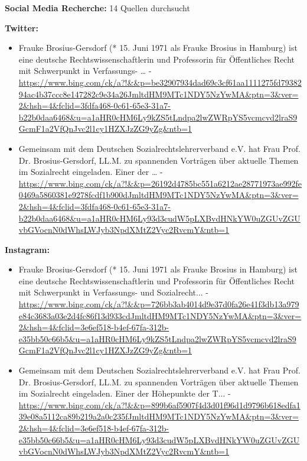 \documentclass[12pt,a4paper]{article}
\begin{document}
\textbf{Social Media Recherche:} 14 Quellen durchsucht

\textbf{Twitter:}
\begin{itemize}
\item Frauke Brosius-Gersdorf (* 15. Juni 1971 als Frauke Brosius in Hamburg) ist eine deutsche Rechtswissenschaftlerin und Professorin für Öffentliches Recht mit Schwerpunkt in Verfassungs- … - \url{https://www.bing.com/ck/a?!&&p=be32907934dad69c3cf61aa1111275fd7938294ac4b37ccc8e147282c9e34a26JmltdHM9MTc1NDY5NzYwMA&ptn=3&ver=2&hsh=4&fclid=3fdfa468-0c61-65e3-31a7-b22b0daa6468&u=a1aHR0cHM6Ly9kZS5tLndpa2lwZWRpYS5vcmcvd2lraS9GcmF1a2VfQnJvc2l1cy1HZXJzZG9yZg&ntb=1}
\item Gemeinsam mit dem Deutschen Sozialrechtslehrerverband e.V. hat Frau Prof. Dr. Brosius-Gersdorf, LL.M. zu spannenden Vorträgen über aktuelle Themen im Sozialrecht eingeladen. Einer der … - \url{https://www.bing.com/ck/a?!&&p=26192d4785bc551a6212ae28771973ae992fe0469a5860381e9278fcdf1b900dJmltdHM9MTc1NDY5NzYwMA&ptn=3&ver=2&hsh=4&fclid=3fdfa468-0c61-65e3-31a7-b22b0daa6468&u=a1aHR0cHM6Ly93d3cudW5pLXBvdHNkYW0uZGUvZGUvbGVocnN0dWhsLWJyb3NpdXMtZ2Vyc2RvcmY&ntb=1}
\end{itemize}

\textbf{Instagram:}
\begin{itemize}
\item Frauke Brosius-Gersdorf (* 15. Juni 1971 als Frauke Brosius in Hamburg) ist eine deutsche Rechtswissenschaftlerin und Professorin für Öffentliches Recht mit Schwerpunkt in Verfassungs- und Sozialrecht... - \url{https://www.bing.com/ck/a?!&&p=726bb3ab4014d9e37d0fa26e41f3db13a979e84c3683a03e2d4fc86f13d933cdJmltdHM9MTc1NDY5NzYwMA&ptn=3&ver=2&hsh=4&fclid=3e6ef518-b4ef-67fa-312b-e35bb50c66b5&u=a1aHR0cHM6Ly9kZS5tLndpa2lwZWRpYS5vcmcvd2lraS9GcmF1a2VfQnJvc2l1cy1HZXJzZG9yZg&ntb=1}
\item Gemeinsam mit dem Deutschen Sozialrechtslehrerverband e.V. hat Frau Prof. Dr. Brosius-Gersdorf, LL.M. zu spannenden Vorträgen über aktuelle Themen im Sozialrecht eingeladen. Einer der Höhepunkte der T... - \url{https://www.bing.com/ck/a?!&&p=899b6af5907f4d3d01f96d1d9796b618edfa139e08a5112ca89b219a2a0c235fJmltdHM9MTc1NDY5NzYwMA&ptn=3&ver=2&hsh=4&fclid=3e6ef518-b4ef-67fa-312b-e35bb50c66b5&u=a1aHR0cHM6Ly93d3cudW5pLXBvdHNkYW0uZGUvZGUvbGVocnN0dWhsLWJyb3NpdXMtZ2Vyc2RvcmY&ntb=1}
\end{itemize}
\end{document}
